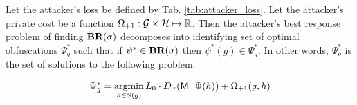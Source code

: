\begin{proposition}\label{prop:mal_loss}
    Let the attacker's loss be defined by Tab. \ref{tab:attacker_loss}. Let the attacker's private cost be a function $\Omega_{{\text{+}1}}: \mathcal{G} \times \mathcal{H} \mapsto \mathbb{R}$. Then the attacker's best response problem of finding $\textbf{BR}(\sigma)$  decomposes into identifying set of optimal obfuscations $\Psi^*_g$ such that if $\psi^* \in \textbf{BR}(\sigma) $ then $\psi^*(g) \in \Psi^*_g$. In other words, $\Psi^*_g$ is the set of solutions to the following problem.

    \begin{equation*}
        \Psi^*_g = \mathop{\text{argmin}}_{h \in S(g)} L_0 \cdot D_\sigma(\mathsf{M} \,\big|\, \Phi(h)) + \Omega_{{\text{+}1}}(g, h)
    \end{equation*}

\end{proposition}

